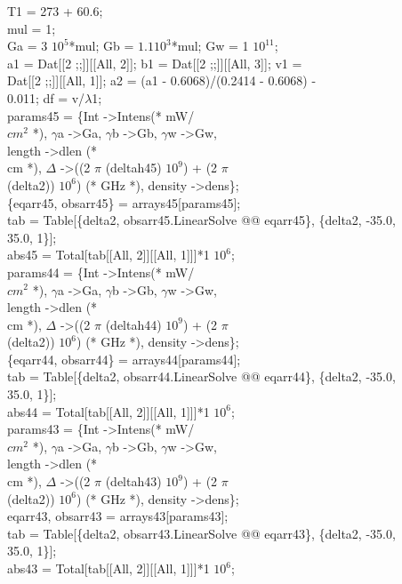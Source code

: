 {T1 = 273 + 60.6;\\
mul = 1;\\
Ga = 3 $10^5$*mul; Gb = $1.1 10^3$*mul; Gw = 1 $10^11$;\\
a1 = Dat[[2 ;;]][[All, 2]]; b1 = Dat[[2 ;;]][[All, 3]]; v1 = \\
 Dat[[2 ;;]][[All, 1]]; a2 = (a1 - 0.6068)/(0.2414 - 0.6068) - \\
  0.011; df = v/$\lambda$1;\\
params45 = \{Int -\textgreater Intens(* mW/\\
   $cm^2$ *), $\gamma$a -\textgreater Ga, $\gamma$b -\textgreater Gb, $\gamma$w -\textgreater Gw, \\
   length -\textgreater dlen (* \\
   cm *), $\Delta$ -\textgreater ((2 $\pi$ (deltah45) $10^{9}$) + (2 $\pi$ \ \\
(delta2)) $10^6$) (* GHz *), density -\textgreater dens\};\\
\{eqarr45, obsarr45\} = arrays45[params45];\\
tab = Table[\{delta2, obsarr45.LinearSolve @@ eqarr45\}, \{delta2, -35.0,\\
     35.0, 1\}];\\
abs45 = Total[tab[[All, 2]][[All, 1]]]*1 $10^6$;\\
params44 = \{Int -\textgreater Intens(* mW/\\
   $cm^2$ *), $\gamma$a -\textgreater Ga, $\gamma$b -\textgreater Gb, $\gamma$w -\textgreater Gw, \\
   length -\textgreater dlen (* \\
   cm *), $\Delta$ -\textgreater ((2 $\pi$ (deltah44) $10^9$) + (2 $\pi$\\
(delta2)) $10^6$) (* GHz *), density -\textgreater dens\};\\
\{eqarr44, obsarr44\} = arrays44[params44];\\
tab = Table[\{delta2, obsarr44.LinearSolve @@ eqarr44\}, \{delta2, -35.0,\\
     35.0, 1\}];\\
abs44 = Total[tab[[All, 2]][[All, 1]]]*1 $10^{6}$;\\
params43 = \{Int -\textgreater Intens(* mW/\\
   $cm^2$ *), $\gamma$a -\textgreater Ga, $\gamma$b -\textgreater Gb, $\gamma$w -\textgreater Gw, \\
   length -\textgreater dlen (* \\
   cm *), $\Delta$ -\textgreater ((2 $\pi$ (deltah43) $10^{9}$) + (2 $\pi$ \\
(delta2)) $10^6$) (* GHz *), density -\textgreater dens\};\\
{eqarr43, obsarr43} = arrays43[params43];\\
tab = Table[\{delta2, obsarr43.LinearSolve @@ eqarr43\}, \{delta2, -35.0,\\
     35.0, 1\}];\\
abs43 = Total[tab[[All, 2]][[All, 1]]]*1 $10^{6}$;\\


}
